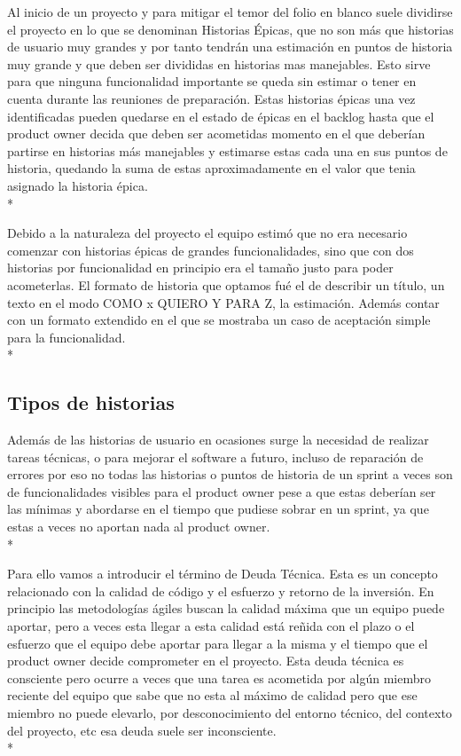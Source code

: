 \documentclass[../pfc.tex]{subfiles}
\begin{document}
	Al inicio de un proyecto y para mitigar el temor del folio en blanco suele dividirse el proyecto en lo que se denominan Historias Épicas, que no son más que historias de usuario muy grandes y por tanto tendrán una estimación en puntos de historia muy grande y que deben ser divididas en historias mas manejables. Esto sirve para que ninguna funcionalidad importante se queda sin estimar o tener en cuenta durante las reuniones de preparación. Estas historias épicas una vez identificadas pueden quedarse en el estado de épicas en el backlog hasta que el product owner decida que deben ser acometidas momento en el que deberían partirse en historias más manejables y estimarse estas cada una en sus puntos de historia, quedando la suma de estas aproximadamente en el valor que tenia asignado la historia épica.\\*
	
	Debido a la naturaleza del proyecto el equipo estimó que no era necesario comenzar con historias épicas de grandes funcionalidades, sino que con dos historias por funcionalidad en principio era el tamaño justo para poder acometerlas. El formato de historia que optamos fué el de describir un título, un texto en el modo COMO x QUIERO Y PARA Z, la estimación. Además contar con un formato extendido en el que se mostraba un caso de aceptación simple para la funcionalidad.\\*
	
	\subsection{Tipos de historias}
	
	Además de las historias de usuario en ocasiones surge la necesidad de realizar tareas técnicas, o para mejorar el software a futuro, incluso de reparación de errores por eso no todas las historias o puntos de historia de un sprint a veces son de funcionalidades visibles para el product owner pese a que estas deberían ser las mínimas y abordarse en el tiempo que pudiese sobrar en un sprint, ya que estas a veces no aportan nada al product owner.\\*
	
	Para ello vamos a introducir el término de Deuda Técnica. Esta es un concepto relacionado con la calidad de código y el esfuerzo y retorno de la inversión. En principio las metodologías ágiles buscan la calidad máxima que un equipo puede aportar, pero a veces esta llegar a esta calidad está reñida con el plazo o el esfuerzo que el equipo debe aportar para llegar a la misma y el tiempo que el product owner decide comprometer en el proyecto. Esta deuda técnica es consciente pero ocurre a veces que una tarea es acometida por algún miembro reciente del equipo que sabe que no esta al máximo de calidad pero que ese miembro no puede elevarlo, por desconocimiento del entorno técnico, del contexto del proyecto, etc esa deuda suele ser inconsciente.\\*
	
\end{document}
